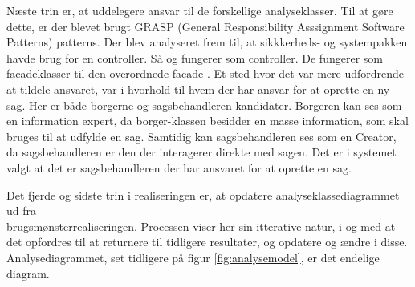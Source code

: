 \documentclass[../../main.tex]{subfiles}
\begin{document}
Næste trin er, at uddelegere ansvar til de forskellige analyseklasser. Til at gøre dette, er der blevet brugt GRASP (General Responsibility Asssignment Software Patterns) patterns. Der blev analyseret frem til, at sikkkerheds- og systempakken havde brug for en controller. Så  og  fungerer som controller. De fungerer som facadeklasser til den overordnede facade . Et sted hvor det var mere udfordrende at tildele ansvaret, var i hvorhold til hvem der har ansvar for at oprette en ny sag. Her er både borgerne og sagsbehandleren kandidater. Borgeren kan ses som en information expert, da borger-klassen besidder en masse information, som skal bruges til at udfylde en sag. Samtidig kan sagsbehandleren ses som en Creator, da sagsbehandleren er den der interagerer direkte med sagen. Det er i systemet valgt at det er sagsbehandleren der har ansvaret for at oprette en sag. 

Det fjerde og sidste trin i realiseringen er, at opdatere analyseklassediagrammet ud fra \\
brugsmønsterrealiseringen. Processen viser her sin itterative natur, i og med at det opfordres til at returnere til tidligere resultater, og opdatere og ændre i disse. Analysediagrammet, set tidligere på figur \ref{fig:analysemodel}, er det endelige diagram. 
\end{document}

